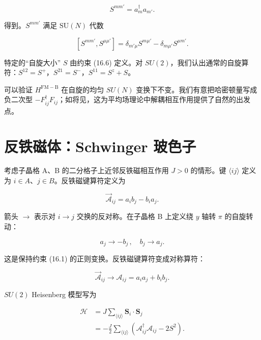 \begin{equation*}
S ^ {mm '} = a _ {m} ^ {\dagger} a _ {m '}.
\tag{16.8}
\end{equation*}

得到。$S^{mm'}$ 满足 $\mathrm{SU}(N)$ 代数

\begin{equation*}
\left[ S ^ {mm '}, S ^ {\mu \mu '} \right] = \delta_{m' \mu} S^{m \mu '} - \delta_{m \mu '} S^{\mu m'}.
\tag{16.9}
\end{equation*}

特定的“自旋大小” $S$ 由约束 (16.6) 定义。对 $SU(2)$，我们认出通常的自旋算符：$S^{12} = S^{+}$，$S^{21} = S^{-}$，$S^{11} = S^{z} + S$。

可以验证 $H^{\mathrm{FM-B}}$ 在自旋的均匀 $SU(N)$ 变换下不变。我们有意把哈密顿量写成负二次型 $-F_{ij}^{\dagger}F_{ij}$；如将见，这为平均场理论中解耦相互作用提供了自然的出发点。

\section{反铁磁体：Schwinger 玻色子}

考虑子晶格 A、B 的二分格子上近邻反铁磁相互作用 $J > 0$ 的情形。键 $\langle ij\rangle$ 定义为 $i \in A$、$j \in B$。反铁磁键算符定义为

\begin{equation*}
\vec {\mathcal {A}} _ {ij} = a _ {i} b _ {j} - b _ {i} a _ {j}.
\tag{16.10}
\end{equation*}

箭头 $\rightarrow$ 表示对 $i \rightarrow j$ 交换的反对称。在子晶格 B 上定义绕 $y$ 轴转 $\pi$ 的自旋转动：

\begin{equation*}
a _ {j} \rightarrow - b _ {j} \, , \quad b _ {j} \rightarrow a _ {j}.
\tag{16.11}
\end{equation*}

这是保持约束 (16.1) 的正则变换。反铁磁键算符变成对称算符：

\begin{equation*}
\vec {\mathcal {A}} _ {ij} \rightarrow \mathcal {A} _ {ij} = a _ {i} a _ {j} + b _ {i} b _ {j}.
\tag{16.12}
\end{equation*}

$SU(2)$ Heisenberg 模型写为

\begin{align*}
\mathcal {H} & = J \sum_{\langle ij \rangle} \mathbf {S} _ {i} \cdot \mathbf {S} _ {j}\\
& = - \frac {J}{2} \sum_{\langle ij \rangle} \left( \mathcal {A} _ {ij} ^ {\dagger} \mathcal {A} _ {ij} - 2 S ^ {2} \right).
\tag{16.13}
\end{align*}

